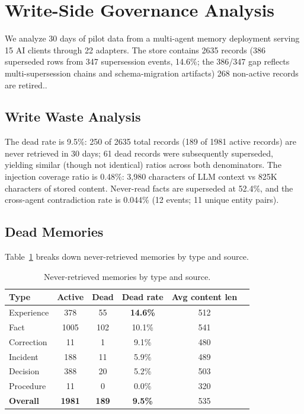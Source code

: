 \documentclass{llncs}
\begin{document}
\section{Write-Side Governance Analysis}


We analyze 30 days of pilot data from a multi-agent memory deployment serving 15 AI clients through 22 adapters. The store contains 2{}635 records (386 superseded rows from 347 supersession events, 14.6\%; the 386/347 gap reflects multi-supersession chains and schema-migration artifacts) 268 non-active records are retired..

\subsection{Write Waste Analysis}

The dead rate is 9.5\%: 250 of 2{}635 total records (189 of 1{}981 active records) are never retrieved in 30 days; 61 dead records were subsequently superseded, yielding similar (though not identical) ratios across both denominators. The injection coverage ratio is 0.48\%: 3,980 characters of LLM context vs 825K characters of stored content. Never-read facts are superseded at 52.4\%, and the cross-agent contradiction rate is 0.044\% (12 events; 11 unique entity pairs).

\subsection{Dead Memories}

Table~\ref{tab:dead} breaks down never-retrieved memories by type and source.

\begin{table}[h]
\centering
\caption{Never-retrieved memories by type and source.}
\label{tab:dead}
\begin{tabular}{lccccc}
\toprule
Type & Active & Dead & Dead rate & Avg content len \\
\midrule
Experience & 378 & 55 & \textbf{14.6\%} & 512 \\
Fact & 1005 & 102 & 10.1\% & 541 \\
Correction & 11 & 1 & 9.1\% & 480 \\
Incident & 188 & 11 & 5.9\% & 489 \\
Decision & 388 & 20 & 5.2\% & 503 \\
Procedure & 11 & 0 & 0.0\% & 320 \\
\midrule
\textbf{Overall} & \textbf{1981} & \textbf{189} & \textbf{9.5\%} & 535 \\
\bottomrule
\end{tabular}
\end{table}
\end{document}
